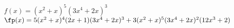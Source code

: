 {$f(x) = (x^2+x)^5(3x^4+2x)^3$}
{$\fp(x) = 5(x^2+x)^4(2x+1)(3x^4+2x)^3+3(x^2+x)^5(3x^4+2x)^2(12x^3+2)$
}